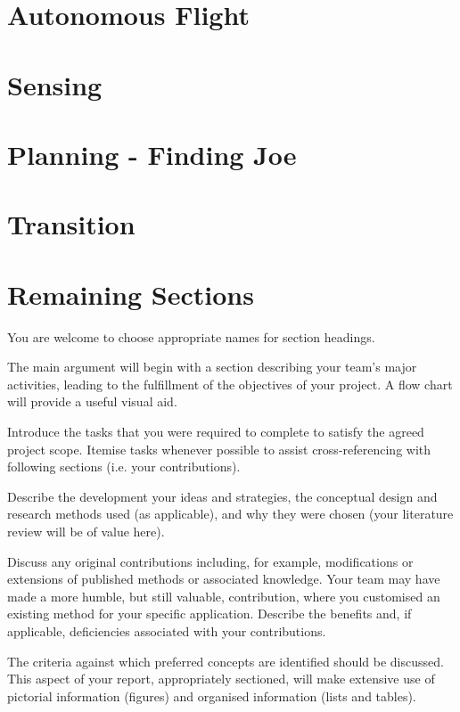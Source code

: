 \documentclass[]{article}
\begin{document}
\section{Autonomous Flight}


\section{Sensing}


\section{Planning - Finding Joe}


\section{Transition}


\section{Remaining Sections}
\color{red}
You are welcome to choose appropriate names for section headings.

The main argument will begin with a section describing your team's major activities, leading to the fulfillment of the objectives of your project.  A flow chart will provide a useful visual aid. \cite{ref:Arcturus}

Introduce the tasks that you were required to complete to satisfy the agreed project scope. Itemise tasks whenever possible to assist cross-referencing with following sections (i.e. your contributions).

Describe the development your ideas and strategies, the conceptual design and research methods used (as applicable), and why they were chosen (your literature review will be of value here).  

Discuss any original contributions including, for example, modifications or extensions of published methods or associated knowledge.  Your team may have made a more humble, but still valuable, contribution, where you customised an existing method for your specific application.  Describe the benefits and, if applicable, deficiencies associated with your contributions.

The criteria against which preferred concepts are identified should be discussed.  This aspect of your report, appropriately sectioned, will make extensive use of pictorial information (figures) and organised information (lists and tables).  
\end{document}
